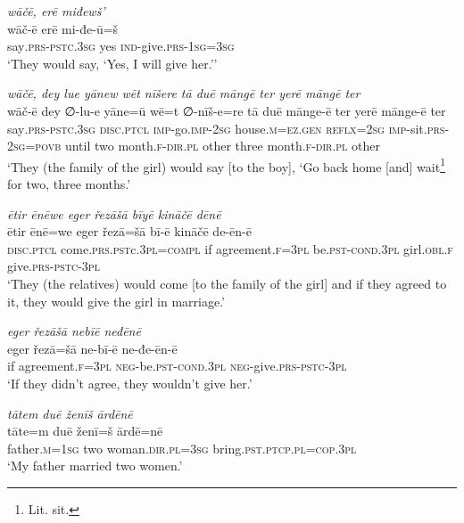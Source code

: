 \ea \label{ŽE.81}
\textit{wāčē, erē miđewš’} \\ 
\gll wāč-ē erē mi-đe-ū=š \\ 
 say\textsc{.prs-pstc}\textsc{.3sg} yes \textsc{ind-}give\textsc{.prs}\textsc{-\textsc{1sg}}\textsc{=3sg} \\ 
\glt `They would say, ‘Yes, I will give her.’'
\z 
 
\ea \label{ŽE.82}
\textit{wāčē, dey lue yānew wēt nīšere tā duē māngē ter yerē māngē ter} \\ 
\gll wāč-ē dey ∅-lu-e yāne=ū wē=t ∅-nīš-e=re tā duē mānge-ē ter yerē mānge-ē ter \\ 
 say\textsc{.prs-pstc}\textsc{.3sg} \textsc{disc}.\textsc{ptcl} \textsc{imp-}go.\textsc{imp-}\textsc{2sg} house\textsc{.m}\textsc{\textsc{=ez.gen}} \textsc{reflx}\textsc{=\textsc{2sg}} \textsc{imp-}sit\textsc{.prs}-\textsc{2sg}\textsc{=\textsc{povb}} until two month\textsc{.f}\textsc{-dir}\textsc{.pl} other three month\textsc{.f}\textsc{-dir}\textsc{.pl} other \\ 
\glt `They (the family of the girl) would say [to the boy], ‘Go back home [and] wait\footnote{Lit. sit.} for two, three months.'
\z 
 
\ea \label{ŽE.84}
\textit{ētir ēnēwe eger řezāšā bīyē kināčē dēnē} \\ 
\gll ētir ēnē=we eger řezā=šā bī-ē kināčē de-ēn-ē \\ 
 \textsc{disc}.\textsc{ptcl} come\textsc{.prs}\textsc{.pst}c\textsc{.3pl}\textsc{=compl} if agreement\textsc{.f}\textsc{=3pl} be\textsc{.pst}\textsc{-cond}\textsc{.3pl} girl\textsc{.obl}\textsc{.f} give\textsc{.prs}\textsc{-pstc-3pl} \\ 
\glt `They (the relatives) would come [to the family of the girl] and if they agreed to it, they would give the girl in marriage.'
\z 
 
\ea \label{ŽE.85}
\textit{eger řezāšā nebīē neđēnē} \\ 
\gll eger řezā=šā ne-bī-ē ne-đe-ēn-ē \\ 
 if agreement\textsc{.f}\textsc{=3pl} \textsc{neg-}be\textsc{.pst}\textsc{-cond}\textsc{.3pl} \textsc{neg-}give\textsc{.prs}\textsc{-pstc-3pl} \\ 
\glt `If they didn’t agree, they wouldn’t give her.'
\z 
 

\ea \label{ŽM.2}
\textit{tātem duē ženīš ārdēnē} \\ 
\gll tāte=m duē ženī=š ārdē=nē \\ 
 father\textsc{.m}\textsc{=\textsc{1sg}} two woman\textsc{.dir}\textsc{.pl}\textsc{=3sg} bring\textsc{.pst}\textsc{.ptcp}\textsc{.pl}\textsc{=cop}\textsc{.3pl} \\ 
\glt `My father married two women.'
\z 
 
